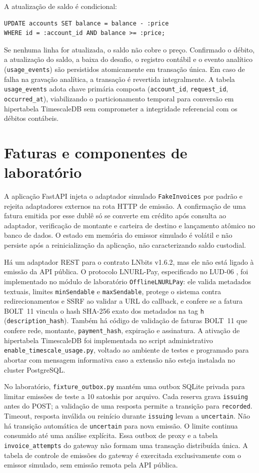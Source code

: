 \documentclass[openright]{normas-utf-tex}
\begin{document}
A atualização de saldo é condicional:
\begin{verbatim}
UPDATE accounts SET balance = balance - :price
WHERE id = :account_id AND balance >= :price;
\end{verbatim}
Se nenhuma linha for atualizada, o saldo não cobre o preço. Confirmado o débito, a atualização do saldo, a baixa do desafio, o registro contábil e o evento analítico (\texttt{usage\_events}) são persistidos atomicamente em transação única. Em caso de falha na gravação analítica, a transação é revertida integralmente. A tabela \texttt{usage\_events} adota chave primária composta (\texttt{account\_id}, \texttt{request\_id}, \texttt{occurred\_at}), viabilizando o particionamento temporal para conversão em hipertabela TimescaleDB sem comprometer a integridade referencial com os débitos contábeis.

\section{Faturas e componentes de laboratório}
A aplicação FastAPI injeta o adaptador simulado \texttt{FakeInvoices} por padrão e rejeita adaptadores externos na rota HTTP de emissão. A confirmação de uma fatura emitida por esse dublê só se converte em crédito após consulta ao adaptador, verificação de montante e carteira de destino e lançamento atômico no banco de dados. O estado em memória do emissor simulado é volátil e não persiste após a reinicialização da aplicação, não caracterizando saldo custodial.

Há um adaptador REST para o contrato LNbits v1.6.2, mas ele não está ligado à emissão da API pública. O protocolo LNURL-Pay, especificado no LUD-06 \cite{lud06}, foi implementado no módulo de laboratório \texttt{OfflineLNURLPay}: ele valida metadados textuais, limites \texttt{minSendable} e \texttt{maxSendable}, protege o sistema contra redirecionamentos e SSRF ao validar a URL do callback, e confere se a fatura BOLT~11 \cite{bolt11} vincula o hash SHA-256 exato dos metadados na tag \texttt{h} (\texttt{description\_hash}). Também há código de validação de faturas BOLT~11 que confere rede, montante, \texttt{payment\_hash}, expiração e assinatura. A ativação de hipertabela TimescaleDB foi implementada no script administrativo \texttt{enable\_timescale\_usage.py}, voltado ao ambiente de testes e programado para abortar com mensagem informativa caso a extensão não esteja instalada no cluster PostgreSQL.

No laboratório, \texttt{fixture\_outbox.py} mantém uma outbox SQLite privada para limitar emissões de teste a 10 satoshis por arquivo. Cada reserva grava \texttt{issuing} antes do POST; a validação de uma resposta permite a transição para \texttt{recorded}. Timeout, resposta inválida ou reinício durante \texttt{issuing} levam a \texttt{uncertain}. Não há transição automática de \texttt{uncertain} para nova emissão. O limite continua consumido até uma análise explícita. Essa outbox de proxy e a tabela \texttt{invoice\_attempts} do gateway não formam uma transação distribuída única. A tabela de controle de emissões do gateway é exercitada exclusivamente com o emissor simulado, sem emissão remota pela API pública.
\end{document}
